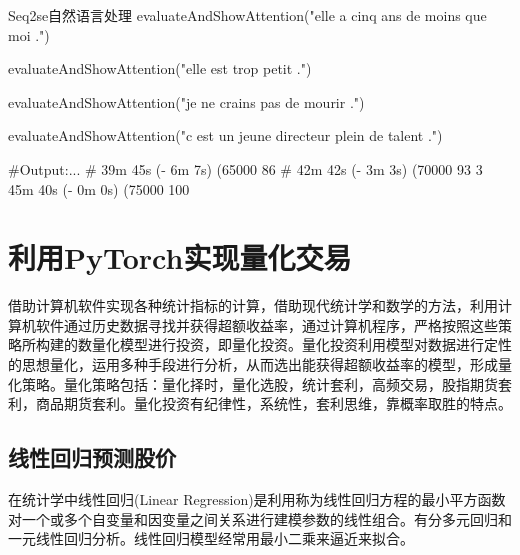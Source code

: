\documentclass[openbib]{article}
\begin{document}
\begin{Python}{Seq2se自然语言处理}
evaluateAndShowAttention("elle a cinq ans de moins que moi .")

evaluateAndShowAttention("elle est trop petit .")

evaluateAndShowAttention("je ne crains pas de mourir .")

evaluateAndShowAttention("c est un jeune directeur plein de talent .")

#Output:...
#		39m 45s (- 6m 7s) (65000 86%
#		42m 42s (- 3m 3s) (70000 93%
3		45m 40s (- 0m 0s) (75000 100%

\end{Python}
\section{利用PyTorch实现量化交易}

借助计算机软件实现各种统计指标的计算，借助现代统计学和数学的方法，利用计算机软件通过历史数据寻找并获得超额收益率，通过计算机程序，严格按照这些策略所构建的数量化模型进行投资，即量化投资。量化投资利用模型对数据进行定性的思想量化，运用多种手段进行分析，从而选出能获得超额收益率的模型，形成量化策略。量化策略包括：量化择时，量化选股，统计套利，高频交易，股指期货套利，商品期货套利。量化投资有纪律性，系统性，套利思维，靠概率取胜的特点。

\subsection{线性回归预测股价}

在统计学中线性回归(Linear Regression)是利用称为线性回归方程的最小平方函数对一个或多个自变量和因变量之间关系进行建模参数的线性组合。有分多元回归和一元线性回归分析。线性回归模型经常用最小二乘来逼近来拟合。
\end{document}
